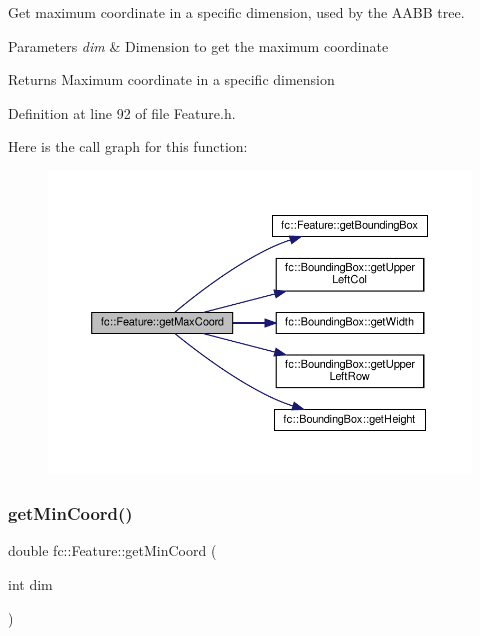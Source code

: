 Get maximum coordinate in a specific dimension, used by the A\+A\+BB tree. 


\begin{DoxyParams}{Parameters}
{\em dim} & Dimension to get the maximum coordinate \\
\hline
\end{DoxyParams}
\begin{DoxyReturn}{Returns}
Maximum coordinate in a specific dimension 
\end{DoxyReturn}


Definition at line 92 of file Feature.\+h.

Here is the call graph for this function\+:
\nopagebreak
\begin{figure}[H]
\begin{center}
\leavevmode
\includegraphics[width=350pt]{d7/d71/classfc_1_1Feature_acaef36b11296ff7130d9454a0195148d_cgraph}
\end{center}
\end{figure}
\mbox{\label{classfc_1_1Feature_a034cb38f61076e527f4f16eecb97c0b4}} 
\subsubsection{\texorpdfstring{get\+Min\+Coord()}{getMinCoord()}}
{\footnotesize\ttfamily double fc\+::\+Feature\+::get\+Min\+Coord (\begin{DoxyParamCaption}\item[{int}]{dim }\end{DoxyParamCaption})\hspace{0.3cm}{\ttfamily [inline]}}




